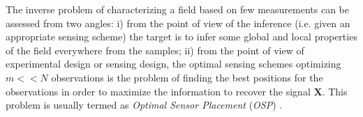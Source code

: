 The inverse problem of characterizing a field based on few measurements can be assessed from two angles: i) from the point of view of the inference (i.e. given an appropriate sensing scheme) the target is to infer some global and local properties of the field everywhere from the samples; ii) from the point of view of experimental design or sensing design, the optimal sensing schemes optimizing $m << N$ observations is the problem of finding the best positions for the observations in order to maximize the information to recover the signal $\mathbf{X}$. This problem is usually termed as \emph{Optimal Sensor Placement} (\emph{OSP}) \citep{olea1984_a,krause08thesis,Krause_2011}.










































































